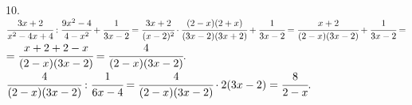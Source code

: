 10. $\cfrac{3x+2}{x^2-4x+4}:\cfrac{9x^2-4}{4-x^2}+\cfrac{1}{3x-2}=
\cfrac{3x+2}{(x-2)^2}\cdot\cfrac{(2-x)(2+x)}{(3x-2)(3x+2)}+\cfrac{1}{3x-2}=
\cfrac{x+2}{(2-x)(3x-2)}+\cfrac{1}{3x-2}=$\\$=\cfrac{x+2+2-x}{(2-x)(3x-2)}=\cfrac{4}{(2-x)(3x-2)}.$\\
$\cfrac{4}{(2-x)(3x-2)}:\cfrac{1}{6x-4}=\cfrac{4}{(2-x)(3x-2)}\cdot2(3x-2)=\cfrac{8}{2-x}.$\\
